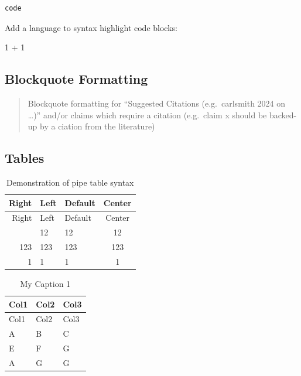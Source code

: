 \documentclass[
  11pt,
  letterpaper,
]{book}
\newenvironment{Shaded}{\begin{snugshade}}{\end{snugshade}}
\newcommand{\DecValTok}[1]{\textcolor[rgb]{0.68,0.00,0.00}{#1}}
\newcommand{\OperatorTok}[1]{\textcolor[rgb]{0.37,0.37,0.37}{#1}}
\begin{document}
\begin{verbatim}
code
\end{verbatim}

Add a language to syntax highlight code blocks:

\begin{Shaded}
\begin{Highlighting}[]
\DecValTok{1} \OperatorTok{+} \DecValTok{1}
\end{Highlighting}
\end{Shaded}

\subsection*{Blockquote Formatting}\label{blockquote-formatting}

\begin{quote}
Blockquote formatting for ``Suggested Citations (e.g.~carlsmith 2024 on
\ldots)'' and/or claims which require a citation (e.g.~claim x should be
backed-up by a ciation from the literature)
\end{quote}

\subsection*{Tables}\label{tables}

\begin{longtable}[]{@{}rllc@{}}
\caption{Demonstration of pipe table
syntax}\label{tbl-letters}\tabularnewline
\toprule\noalign{}
Right & Left & Default & Center \\
\midrule\noalign{}
\endfirsthead
\toprule\noalign{}
Right & Left & Default & Center \\
\midrule\noalign{}
\endhead
\bottomrule\noalign{}
\endlastfoot
12 & 12 & 12 & 12 \\
123 & 123 & 123 & 123 \\
1 & 1 & 1 & 1 \\
\end{longtable}

\begin{longtable}[]{@{}lll@{}}
\caption{My Caption 1}\label{tbl-letters}\tabularnewline
\toprule\noalign{}
Col1 & Col2 & Col3 \\
\midrule\noalign{}
\endfirsthead
\toprule\noalign{}
Col1 & Col2 & Col3 \\
\midrule\noalign{}
\endhead
\bottomrule\noalign{}
\endlastfoot
A & B & C \\
E & F & G \\
A & G & G \\
\end{longtable}
\end{document}
